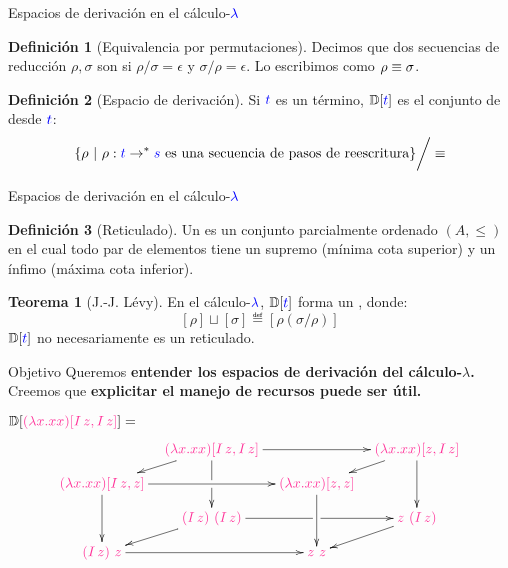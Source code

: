 \documentclass{beamer}
\theoremstyle{definition}
\newtheorem{defes}{Definición}
\newtheorem{teoes}{Teorema}
\newcommand{\cLam}[1]{{\color{darkBlue} #1}}
\newcommand{\cProto}[1]{{\color{lightBlue} #1}}
\newcommand{\clambda}{\cLam{\lambda}}
\begin{document}
\begin{frame}{Espacios de derivación en el cálculo-$\clambda$}
\begin{defes}[Equivalencia por permutaciones]
  Decimos que dos secuencias de reducción $\rho, \sigma$ son  si $\rho/\sigma = \epsilon$ y $\sigma/\rho = \epsilon$.
Lo escribimos como $\rho \equiv \sigma$.
\end{defes}

\vskip 0.7cm

\begin{defes}[Espacio de derivación]
Si $\cLam{\tm}$ es un término, $\ulbDeriv{\cLam{\tm}}$ es el conjunto de
 desde $\cLam{\tm}$:
\[
  \set{\rho \ | \ \rho : \cLam{t} \to^* \cLam{s} \text{ es una secuencia de pasos de reescritura}} \bigg/ \permeq
\]
\end{defes}
\end{frame}

\begin{frame}{Espacios de derivación en el cálculo-$\clambda$}

\begin{defes}[Reticulado]
  Un  es un conjunto parcialmente ordenado $(A, \leq)$ en el cual
todo par de elementos tiene un supremo (mínima cota superior)
y un ínfimo (máxima cota inferior).
\end{defes}

\vskip 0.5cm

\begin{teoes}[J.-J. Lévy]
En el cálculo-$\clambda$, $\ulbDeriv{\cLam{t}}$ forma un ,
donde:
\[[\rho] \sqcup [\sigma] \eqdef [\rho (\sigma / \rho)] \]
\noindent $\ulbDeriv{\cLam{t}}$ no necesariamente es un reticulado.
\end{teoes}

\end{frame}


\begin{frame}{Objetivo}
Queremos \textbf{entender los espacios de derivación del cálculo-$\lambda$.}
\vskip 0.2cm
Creemos que \textbf{explicitar el manejo de recursos puede ser útil.}
\vskip 0.5cm

$\ulbDeriv{\cProto{(\lam{x}{x x}) [I\, z, I\, z]}} = $
\[\xymatrix@=0.3cm{
& \cProto{(\lam{x}{x x}) [I\, z, I\, z]} \ar[rr] \ar[dd]|!{[d]}\hole \ar[dl]
& & \cProto{(\lam{x}{x x}) [z, I\, z]} \ar[dd] \ar[dl]
\\
\cProto{(\lam{x}{x x}) [I\, z, z]} \ar[rr]\ar[dd]
& & \cProto{(\lam{x}{x x}) [z, z]} \ar[dd]
\\
& \cProto{(I\, z)\ (I\, z)} \ar[rr]|!{[r]}\hole \ar[dl]
& & \cProto{z\ (I\, z)} \ar[dl]
\\
\cProto{(I\, z)\ z} \ar[rr]
& & \cProto{z\ z}
}\]
\end{frame}
\end{document}
